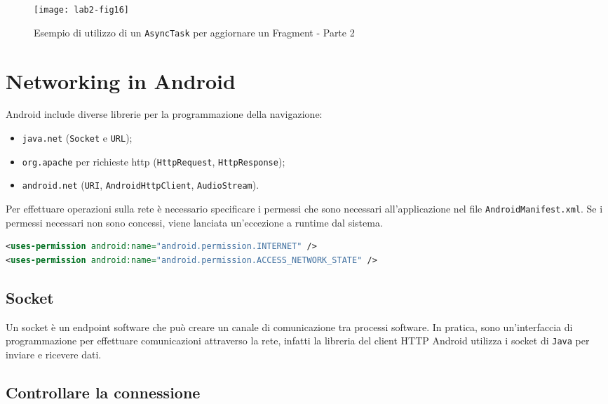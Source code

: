 \begin{figure*}[htbp]
        \centering
        \texttt{[image: lab2-fig16]}
        \caption[AsyncTask per aggiornare Fragment - 2]{Esempio di utilizzo di
un \texttt{AsyncTask} per aggiornare un Fragment - Parte 2}
        \label{img:lab2-fig16}
\end{figure*}

\section{Networking in Android}

Android include diverse librerie per la programmazione della navigazione:
\begin{itemize}
\item \texttt{java.net} (\texttt{Socket} e \texttt{URL});
\item \texttt{org.apache} per richieste http (\texttt{HttpRequest},
\texttt{HttpResponse});
\item \texttt{android.net} (\texttt{URI}, \texttt{AndroidHttpClient},
\texttt{AudioStream}).
\end{itemize}

Per effettuare operazioni sulla rete è necessario specificare i permessi che
sono necessari all'applicazione nel file \texttt{AndroidManifest.xml}. Se i
permessi necessari non sono concessi, viene lanciata un'eccezione a runtime dal
sistema.

\begin{lstlisting}[language=XML]
<uses-permission android:name="android.permission.INTERNET" />
<uses-permission android:name="android.permission.ACCESS_NETWORK_STATE" />
\end{lstlisting}

\subsection{Socket}

Un socket è un endpoint software che può creare un canale di comunicazione tra
processi software. In pratica, sono un'interfaccia di programmazione per
effettuare comunicazioni attraverso la rete, infatti la libreria del client HTTP
Android utilizza i socket di \texttt{Java} per inviare e ricevere dati.


\subsection{Controllare la connessione}

